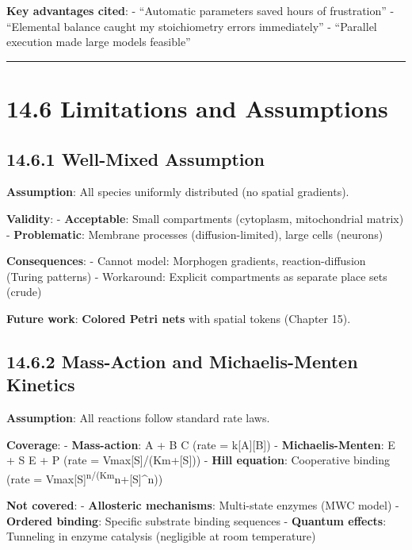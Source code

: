 \textbf{Key advantages cited}: - ``Automatic parameters saved hours of
frustration'' - ``Elemental balance caught my stoichiometry errors
immediately'' - ``Parallel execution made large models feasible''

\begin{center}\rule{0.5\linewidth}{0.5pt}\end{center}

\hypertarget{limitations-and-assumptions}{%
\section{14.6 Limitations and
Assumptions}\label{limitations-and-assumptions}}

\hypertarget{well-mixed-assumption}{%
\subsection{14.6.1 Well-Mixed Assumption}\label{well-mixed-assumption}}

\textbf{Assumption}: All species uniformly distributed (no spatial
gradients).

\textbf{Validity}: - \textbf{Acceptable}: Small compartments (cytoplasm,
mitochondrial matrix) - \textbf{Problematic}: Membrane processes
(diffusion-limited), large cells (neurons)

\textbf{Consequences}: - Cannot model: Morphogen gradients,
reaction-diffusion (Turing patterns) - Workaround: Explicit compartments
as separate place sets (crude)

\textbf{Future work}: \textbf{Colored Petri nets} with spatial tokens
(Chapter 15).

\hypertarget{mass-action-and-michaelis-menten-kinetics}{%
\subsection{14.6.2 Mass-Action and Michaelis-Menten
Kinetics}\label{mass-action-and-michaelis-menten-kinetics}}

\textbf{Assumption}: All reactions follow standard rate laws.

\textbf{Coverage}: - \textbf{Mass-action}: A + B \textrightarrow C (rate =
k{[}A{]}{[}B{]}) - \textbf{Michaelis-Menten}: E + S \textrightarrow E + P (rate =
Vmax{[}S{]}/(Km+{[}S{]})) - \textbf{Hill equation}: Cooperative binding
(rate = Vmax{[}S{]}\textsuperscript{n/(Km}n+{[}S{]}\^{}n))

\textbf{Not covered}: - \textbf{Allosteric mechanisms}: Multi-state
enzymes (MWC model) - \textbf{Ordered binding}: Specific substrate
binding sequences - \textbf{Quantum effects}: Tunneling in enzyme
catalysis (negligible at room temperature)

